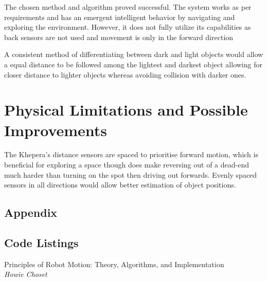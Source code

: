 \documentclass[11pt, a4paper]{article}
\begin{document}
The chosen method and algorithm proved successful. The system works as
per requirements and has an emergent intelligent behavior by
navigating and exploring the environment. However, it does not fully utilize its 
capabilities as back sensors are not used and movement is only in the
forward direction

A consistent method of differentiating between dark and light objects
would allow a equal distance to be followed among the lightest and darkest object
allowing for closer distance to lighter objects whereas avoiding collision with
darker ones.

\section{Physical Limitations and Possible Improvements}

The Khepera's distance sensors are spaced to prioritise forward motion, which is beneficial 
for exploring a space though does make reversing out of a dead-end much harder than 
turning on the spot then driving out forwards. Evenly spaced sensors in all directions would 
allow better estimation of object positions.



\begin{appendices}
\section*{Appendix}
\subsection{Code Listings}



\end{appendices}


\begin{thebibliography}{1}

Principles of Robot Motion: Theory, Algorithms, and Implementation\\
\textit{Howie Choset}

\end{thebibliography}
\end{document}

